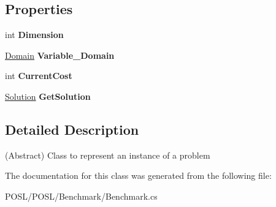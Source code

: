 \subsection*{Properties}
\begin{DoxyCompactItemize}
\item 
\mbox{\label{classPOSL_1_1Benchmarks_1_1Benchmark_a430d199f3d0bf357b43f876deb380110}} 
int {\bfseries Dimension}
\item 
\mbox{\label{classPOSL_1_1Benchmarks_1_1Benchmark_abe0aa39dceb516506b4f61f989bc78fe}} 
\hyperlink{classPOSL_1_1Domain}{Domain} {\bfseries Variable\+\_\+\+Domain}
\item 
\mbox{\label{classPOSL_1_1Benchmarks_1_1Benchmark_a2fed212788c95bfe98d2a47b6a05cb82}} 
int {\bfseries Current\+Cost}
\item 
\mbox{\label{classPOSL_1_1Benchmarks_1_1Benchmark_a25c6ad71eaeee07eec0578d8ffff148e}} 
\hyperlink{classPOSL_1_1Data_1_1Solution}{Solution} {\bfseries Get\+Solution}
\end{DoxyCompactItemize}


\subsection{Detailed Description}
(Abstract) Class to represent an instance of a problem 

The documentation for this class was generated from the following file\+:\begin{DoxyCompactItemize}
\item 
P\+O\+S\+L/\+P\+O\+S\+L/\+Benchmark/Benchmark.\+cs\end{DoxyCompactItemize}
